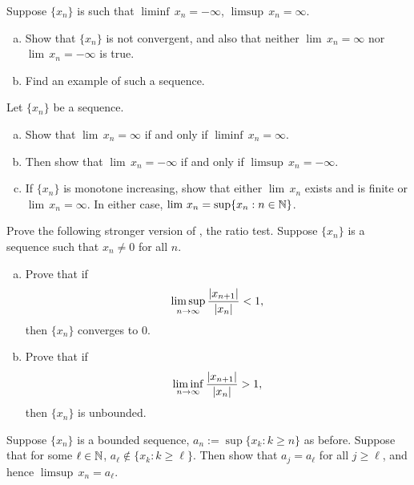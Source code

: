 \begin{exercise}[Easy] \label{exercise:infseqlimex}
Suppose $\{ x_n \}$ is such that $\liminf \, x_n = -\infty$, $\limsup \, x_n
= \infty$.
\begin{enumerate}[a)]
\item
Show that $\{ x_n \}$ is not convergent, and also
that neither $\lim \, x_n = \infty$ nor $\lim \, x_n =
-\infty$
is true.
\item
Find an example of such a sequence.
\end{enumerate}
\end{exercise}

\begin{exercise} \label{exercise:infseqlimlims}
Let $\{ x_n \}$ be a sequence.
\begin{enumerate}[a)]
\item
Show that
$\lim \, x_n = \infty$ if and only if $\liminf \, x_n = \infty$.
\item
Then show that $\lim \, x_n = - \infty$ if and only if $\limsup \, x_n =
-\infty$.
\item
If $\{ x_n \}$ is monotone increasing, show that either
$\lim \, x_n$ exists and is finite or $\lim \, x_n = \infty$.  In either
case, $\lim \, x_n = \sup \{ x_n : n \in {\mathbb{N}} \}$.
\end{enumerate}
\end{exercise}

\begin{exercise} \label{exercise:strongerratiotest2}
Prove the following stronger version of , the ratio
test.
Suppose $\{ x_n \}$ is a sequence such that $x_n \not= 0$ for all
$n$.
\begin{enumerate}[a)]
\item
Prove that if
\begin{equation*}
\limsup_{n \to \infty} \frac{\left\lvert {x_{n+1}} \right\rvert}{\left\lvert {x_n} \right\rvert} < 1 ,
\end{equation*}
then $\{ x_n \}$ converges to $0$.
\item
Prove that if
\begin{equation*}
\liminf_{n \to \infty} \frac{\left\lvert {x_{n+1}} \right\rvert}{\left\lvert {x_n} \right\rvert} > 1 ,
\end{equation*}
then $\{ x_n \}$ is unbounded.
\end{enumerate}
\end{exercise}

\begin{exercise}
Suppose $\{ x_n \}$ is a bounded sequence, $a_n := \sup \{ x_k : k \geq n \}$
as before.  Suppose that for some $\ell \in {\mathbb{N}}$,
$a_\ell \notin \{ x_k : k \geq \ell \}$.  Then show that $a_j = a_\ell$ for all $j \geq \ell$, and hence
$\limsup\, x_n = a_\ell$.
\end{exercise}

